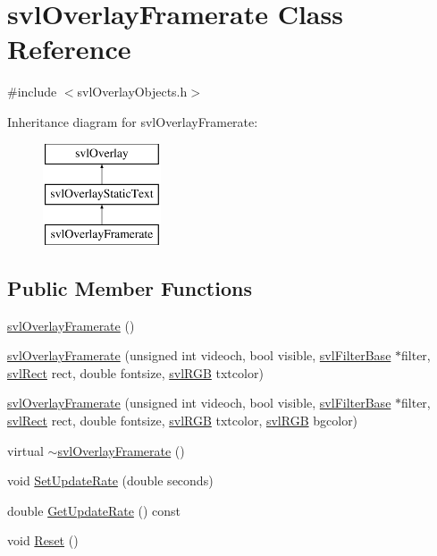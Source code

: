 \hypertarget{classsvl_overlay_framerate}{}\section{svl\+Overlay\+Framerate Class Reference}
\label{classsvl_overlay_framerate}


{\ttfamily \#include $<$svl\+Overlay\+Objects.\+h$>$}

Inheritance diagram for svl\+Overlay\+Framerate\+:\begin{figure}[H]
\begin{center}
\leavevmode
\includegraphics[height=3.000000cm]{d8/d37/classsvl_overlay_framerate}
\end{center}
\end{figure}
\subsection*{Public Member Functions}
\begin{DoxyCompactItemize}
\item 
\hyperlink{classsvl_overlay_framerate_a37588edc37a46d34f272f566f4086ceb}{svl\+Overlay\+Framerate} ()
\item 
\hyperlink{classsvl_overlay_framerate_a6756410e02a4ffdc1952fbb1d48725fe}{svl\+Overlay\+Framerate} (unsigned int videoch, bool visible, \hyperlink{classsvl_filter_base}{svl\+Filter\+Base} $\ast$filter, \hyperlink{structsvl_rect}{svl\+Rect} rect, double fontsize, \hyperlink{structsvl_r_g_b}{svl\+R\+G\+B} txtcolor)
\item 
\hyperlink{classsvl_overlay_framerate_ad8db9b32332556ec59a61cc41021e2b7}{svl\+Overlay\+Framerate} (unsigned int videoch, bool visible, \hyperlink{classsvl_filter_base}{svl\+Filter\+Base} $\ast$filter, \hyperlink{structsvl_rect}{svl\+Rect} rect, double fontsize, \hyperlink{structsvl_r_g_b}{svl\+R\+G\+B} txtcolor, \hyperlink{structsvl_r_g_b}{svl\+R\+G\+B} bgcolor)
\item 
virtual \hyperlink{classsvl_overlay_framerate_aa947a1d99a89140062b28af12af80f7f}{$\sim$svl\+Overlay\+Framerate} ()
\item 
void \hyperlink{classsvl_overlay_framerate_a2400320400efe0226acfdf6540e19932}{Set\+Update\+Rate} (double seconds)
\item 
double \hyperlink{classsvl_overlay_framerate_acd58f29e77f6082470d478aa931c45fd}{Get\+Update\+Rate} () const 
\item 
void \hyperlink{classsvl_overlay_framerate_af9968d96022ac978a8e5408b6193fe45}{Reset} ()
\end{DoxyCompactItemize}
